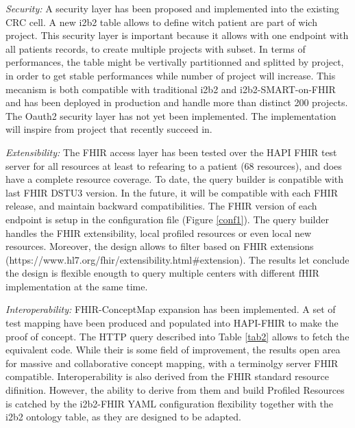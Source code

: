 \documentclass{amia}
\begin{document}
\textit{Security: }A security layer has been proposed and implemented into the existing CRC cell. A new i2b2 table allows to define witch patient are part of wich project. This security layer is important because it allows with one endpoint with all patients records, to create multiple projects with subset. In terms of performances, the table might be vertivally partitionned and splitted by project, in order to get stable performances while number of project will increase. This mecanism is both compatible with traditional i2b2 and i2b2-SMART-on-FHIR and has been deployed in production and handle more than distinct 200 projects.
The Oauth2 security layer has not yet been implemented. The implementation will inspire from project\cite{wag,apple} that recently succeed in.

\textit{Extensibility:} The FHIR access layer has been tested over the HAPI FHIR test server for all resources at least to refearing to a patient (68 resources), and does have a complete resource coverage. To date, the query builder is conpatible with last FHIR DSTU3 version. In the future, it will be compatible with each FHIR release, and maintain backward compatibilities. The FHIR version of each endpoint is setup in the configuration file (Figure \ref{conf1}). The query builder handles the FHIR extensibility, local profiled resources or even local new resources. Moreover, the design allows to filter based on FHIR extensions (https://www.hl7.org/fhir/extensibility.html\#extension). The results let conclude the design is flexible enougth to query multiple centers with different fHIR implementation at the same time.

\textit{Interoperability: }FHIR-ConceptMap expansion has been implemented. A set of test mapping have been produced and populated into HAPI-FHIR to make the proof of concept. The HTTP query described into Table \ref{tab2} allows to fetch the equivalent code. While their is some field of improvement, the results open area for massive and collaborative concept mapping, with a terminolgy server FHIR compatible. 
Interoperability is also derived from the FHIR standard resource difinition. However, the ability to derive from them and build Profiled Resources is catched by the i2b2-FHIR YAML configuration flexibility together with the i2b2 ontology table, as they are designed to be adapted.
\end{document}
